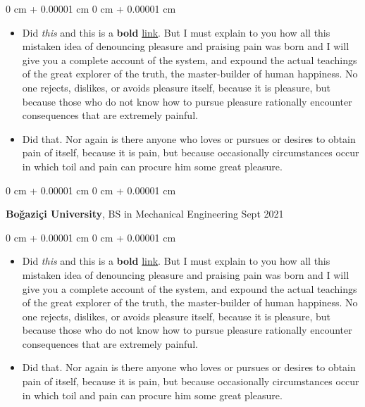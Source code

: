 \documentclass[10pt, letterpaper]{article}
\newenvironment{highlights}{
    \begin{itemize}[
        topsep=0.10 cm,
        parsep=0.10 cm,
        partopsep=0pt,
        itemsep=0pt,
        leftmargin=0 cm + 10pt
    ]
}{
    \end{itemize}
} %
\newenvironment{onecolentry}{
    \begin{adjustwidth}{
        0 cm + 0.00001 cm
    }{
        0 cm + 0.00001 cm
    }
}{
    \end{adjustwidth}
} %
\newenvironment{twocolentry}[2][]{
    \onecolentry
    \def\secondColumn{#2}
    \setcolumnwidth{\fill, 4.5 cm}
    \begin{paracol}{2}
}{
    \switchcolumn \raggedleft \secondColumn
    \end{paracol}
    \endonecolentry
} %
\begin{document}
        \vspace{0.10 cm}
        \begin{onecolentry}
            \begin{highlights}
                \item Did \textit{this} and this is a \textbf{bold} \href{https://example.com}{link}. But I must explain to you how all this mistaken idea of denouncing pleasure and praising pain was born and I will give you a complete account of the system, and expound the actual teachings of the great explorer of the truth, the master-builder of human happiness. No one rejects, dislikes, or avoids pleasure itself, because it is pleasure, but because those who do not know how to pursue pleasure rationally encounter consequences that are extremely painful.
                \item Did that. Nor again is there anyone who loves or pursues or desires to obtain pain of itself, because it is pain, but because occasionally circumstances occur in which toil and pain can procure him some great pleasure.
            \end{highlights}
        \end{onecolentry}


        \vspace{0.2 cm}

        \begin{twocolentry}{
            Sept 2021
        }
            \textbf{Boğaziçi University}, BS in Mechanical Engineering\end{twocolentry}

        \vspace{0.10 cm}
        \begin{onecolentry}
            \begin{highlights}
                \item Did \textit{this} and this is a \textbf{bold} \href{https://example.com}{link}. But I must explain to you how all this mistaken idea of denouncing pleasure and praising pain was born and I will give you a complete account of the system, and expound the actual teachings of the great explorer of the truth, the master-builder of human happiness. No one rejects, dislikes, or avoids pleasure itself, because it is pleasure, but because those who do not know how to pursue pleasure rationally encounter consequences that are extremely painful.
                \item Did that. Nor again is there anyone who loves or pursues or desires to obtain pain of itself, because it is pain, but because occasionally circumstances occur in which toil and pain can procure him some great pleasure.
            \end{highlights}
        \end{onecolentry}
\end{document}
